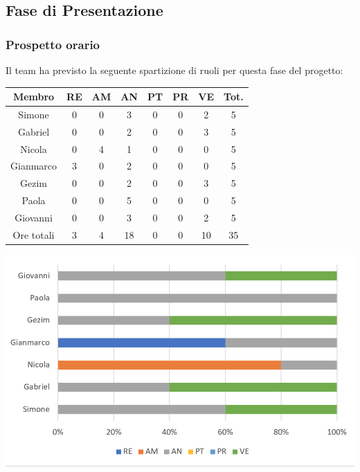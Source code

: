 \subsection{Fase di Presentazione}
\subsubsection{Prospetto orario}
Il team ha previsto la seguente spartizione di ruoli per questa fase del progetto:
\\
\begin{center}
\begin{tabular}{ |c|c|c|c|c|c|c|c|  }
 \hline
 Membro 		& RE 	& AM 	& AN 	& PT 	& PR 	& VE 	& Tot.\\
 \hline\hline
 Simone			& 0 		& 0		& 3 	& 0 		& 0 		& 2 		& 5\\
 Gabriel		& 0 		& 0 		& 2 	& 0 		& 0 		& 3 		& 5\\
 Nicola			& 0 		& 4 		& 1 	& 0 		& 0 		& 0 		& 5\\
 Gianmarco		& 3 		& 0 		& 2 	& 0 		& 0 		& 0 		& 5\\
 Gezim			& 0 		& 0 		& 2 	& 0 		& 0 		& 3	 	& 5\\
 Paola			& 0 		& 0 		& 5 	& 0 		& 0 		& 0 		& 5\\
 Giovanni		& 0 		& 0	 	& 3 	& 0 		& 0 		& 2  	& 5\\
 \hline\hline
 Ore totali		& 3		& 4		& 18 	& 0	 	& 0 		& 10 		& 35\\
  \hline
\end{tabular}
\end{center}
\includegraphics[width=\textwidth]{res/img/hi2}
\newpage
